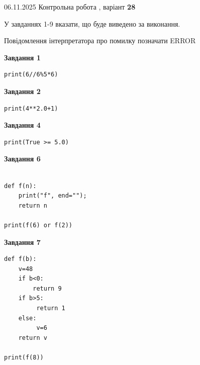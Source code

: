 \documentclass[12pt, ukrainian]{article}
\begin{document}
{\Large{06.11.2025 Контрольна робота , варіант  \No \textbf { 28 }\par}}
{
\begin {large}
У завданнях 1-9 вказати, що буде виведено за виконання.

Повідомлення інтерпретатора про помилку позначати ERROR

\begin{minipage}[t]{7.5cm}

\begin{center}
\textbf{Завдання 1}
\end{center}

\begin{verbatim}
print(6//6%5*6)
\end{verbatim}



\begin{center}
\textbf{Завдання 2}
\end{center}

\begin{verbatim}
print(4**2.0+1)
\end{verbatim}



\begin{center}
\textbf{Завдання 4}
\end{center}

\begin{verbatim}
print(True >= 5.0)
\end{verbatim}



\begin{center}
\textbf{Завдання 6}
\end{center}

\begin{verbatim}

def f(n):
    print("f", end="");
    return n

print(f(6) or f(2))
\end{verbatim}



\begin{center}
\textbf{Завдання 7}
\end{center}

\begin{verbatim}
def f(b):
    v=48
    if b<0: 
        return 9
    if b>5:
         return 1
    else:
         v=6
    return v

print(f(8))
\end{verbatim}


\end{minipage}
\end{large}}
\end{document}
